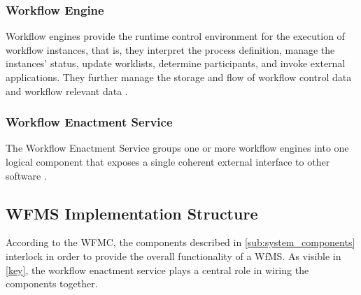     \subsubsection{Workflow Engine} %
    \label{ssub:workflow_engine}
      Workflow engines provide the runtime control environment for the execution of workflow instances, that is, they interpret the process definition, manage the instances' status, update worklists, determine participants, and invoke external applications. They further manage the storage and flow of workflow control data and workflow relevant data \cite{Hollingsworth1995Wfmc}.

    \subsubsection{Workflow Enactment Service} %
    \label{ssub:workflow_enactment_service}
      The Workflow Enactment Service groups one or more workflow engines into one logical component that exposes a single coherent external interface to other software \cite{Hollingsworth1995Wfmc}.

  \subsection{WFMS Implementation Structure} %
  \label{sub:wfms_implementation_structure}
    According to the \ac{WFMC}, the components described in \ref{sub:system_components} interlock in order to provide the overall functionality of a \ac{WfMS}. As visible in \ref{key}, the workflow enactment service plays a central role in wiring the components together.


